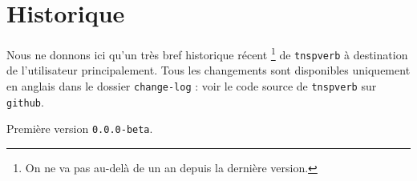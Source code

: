 \documentclass[12pt,a4paper]{article}
\begin{document}
\newpage

\section{Historique}

Nous ne donnons ici qu'un très bref historique récent
\footnote{
	On ne va pas au-delà de un an depuis la dernière version.
}
de \verb+tnspverb+ à destination de l'utilisateur principalement.
Tous les changements sont disponibles uniquement en anglais dans le dossier \verb+change-log+ : voir le code source de \verb+tnspverb+ sur \verb+github+.

\begin{description}

    \medskip
    \item[2020-09-06] Première version \verb+0.0.0-beta+.


\end{description}
\end{document}
